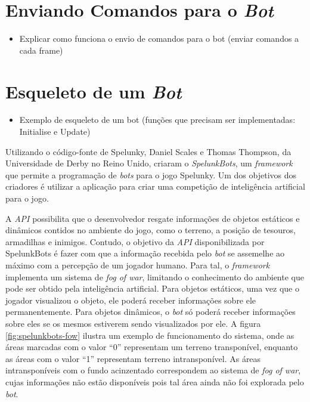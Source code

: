 \section{Enviando Comandos para o \textit{Bot}}
\begin{mdframed}[backgroundcolor=green!20]
\begin{itemize}
    \item
		Explicar como funciona o envio de comandos para o bot (enviar comandos a
		cada frame)
\end{itemize}
\end{mdframed}


\section{Esqueleto de um \textit{Bot}}
\begin{mdframed}[backgroundcolor=green!20]
\begin{itemize}
    \item
		Exemplo de esqueleto de um bot (funções que precisam ser implementadas:
		Initialise e Update)
\end{itemize}
\end{mdframed}


Utilizando o código-fonte de Spelunky, Daniel Scales e Thomas Thompson, da
Universidade de Derby no Reino Unido, criaram o
\textit{SpelunkBots}\cite{SPELUNKBOTSPAPER}, um
\textit{framework} que permite a programação de \textit{bots} para o jogo
Spelunky. Um dos objetivos dos criadores é utilizar a aplicação para criar uma
competição de inteligência artificial para o jogo.

A \textit{API} possibilita que o desenvolvedor resgate informações de objetos
estáticos e dinâmicos contidos no ambiente do jogo, como o terreno, a
posição de tesouros, armadilhas e inimigos. Contudo, o objetivo da \textit{API}
disponibilizada por SpelunkBots é fazer com que a informação recebida pelo
\textit{bot} se assemelhe ao máximo com a percepção de um jogador humano.  Para
tal, o \textit{framework} implementa um sistema de \textit{fog of war},
limitando o conhecimento do ambiente que pode ser obtido pela inteligência
artificial. Para objetos estáticos, uma vez que o jogador visualizou o objeto,
ele poderá receber informações sobre ele permanentemente. Para objetos
dinâmicos, o \textit{bot} só poderá receber informações sobre eles se os mesmos
estiverem sendo visualizados por ele. A figura \ref{fig:spelunkbots-fow} ilustra
um exemplo de funcionamento do sistema, onde as áreas marcadas com o valor ``0''
representam um terreno transponível, enquanto as áreas com o valor ``1''
representam terreno intransponível. As áreas intransponíveis com o fundo
acinzentado correspondem ao sistema de \textit{fog of war}, cujas informações
não estão disponíveis pois tal área ainda não foi explorada pelo \textit{bot}.

